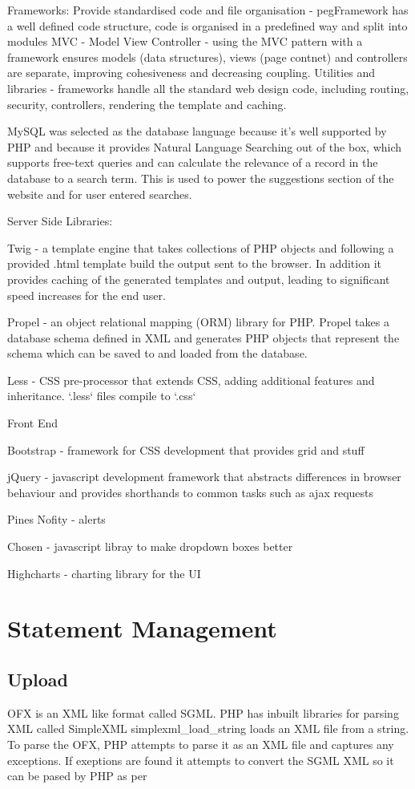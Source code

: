 Frameworks:
Provide standardised code and file organisation - pegFramework has a well defined code structure, code is organised in a predefined way and split into modules
MVC - Model View Controller - using the MVC pattern with a framework ensures models (data structures), views (page contnet) and controllers are separate, improving cohesiveness and decreasing coupling.
Utilities and libraries - frameworks handle all the standard web design code, including routing, security, controllers, rendering the template and caching.

MySQL was selected as the database language because it's well supported by PHP and because it provides Natural Language Searching out of the box, which supports free-text queries and can calculate the relevance of a record in the database to a search term. This is used to power the suggestions section of the website and for user entered searches.

Server Side Libraries:

Twig - a template engine that takes collections of PHP objects and following a provided .html template build the output sent to the browser. In addition it provides caching of the generated templates and output, leading to significant speed increases for the end user.

Propel - an object relational mapping (ORM) library for PHP. Propel takes a database schema defined in XML and generates PHP objects that represent the schema which can be saved to and loaded from the database.

Less - CSS pre-processor that extends CSS, adding additional features and inheritance. `.less` files compile to `.css`

Front End

Bootstrap - framework for CSS development that provides grid and stuff

jQuery - javascript development framework that abstracts differences in browser behaviour and provides shorthands to common tasks such as ajax requests

Pines Nofity - alerts

Chosen - javascript libray to make dropdown boxes better

Highcharts - charting library for the UI

\section{Statement Management}

\subsection{Upload}
OFX is an XML like format called SGML. PHP has inbuilt libraries for parsing XML called SimpleXML simplexml\_load\_string loads an XML file from a string. To parse the OFX, PHP attempts to parse it as an XML file and captures any exceptions. If exeptions are found it attempts to convert the SGML XML so it can be pased by PHP as per 

